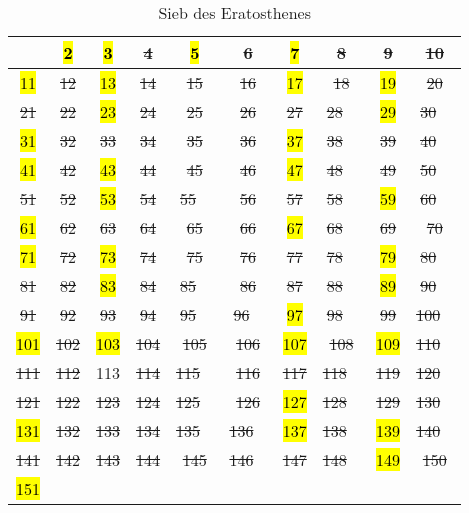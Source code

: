 \documentclass[12pt,a4paper]{article}
\theoremstyle{definition}
\begin{document}
\begin{table}[h]\begin{center}
\begin{tabular}{c|c|c|c|c|c|c|c|c|c}
   & \hl{ 2 }& \hl{ 3 }& \st{ 4 } & \hl{ 5 }& \st{ 6 } & \hl{ 7 }& \st{ 8 } & \st{ 9 } & \st{ 10 } \\
\hline
\hl{ 11 }& \st{ 12 } & \hl{ 13 }& \st{ 14 } & \st{ 15 } & \st{ 16 } & \hl{ 17 }& \st{ 18 } & \hl{ 19 }& \st{ 20 } \\
\hline
\st{ 21 } & \st{ 22 } & \hl{ 23 }& \st{ 24 } & \st{ 25 } & \st{ 26 } & \st{ 27 } & \st{ 28 } & \hl{ 29 }& \st{ 30 } \\
\hline
\hl{ 31 }& \st{ 32 } & \st{ 33 } & \st{ 34 } & \st{ 35 } & \st{ 36 } & \hl{ 37 }& \st{ 38 } & \st{ 39 } & \st{ 40 } \\
\hline
\hl{ 41 }& \st{ 42 } & \hl{ 43 }& \st{ 44 } & \st{ 45 } & \st{ 46 } & \hl{ 47 }& \st{ 48 } & \st{ 49 } & \st{ 50 } \\
\hline
\st{ 51 } & \st{ 52 } & \hl{ 53 }& \st{ 54 } & \st{ 55 } & \st{ 56 } & \st{ 57 } & \st{ 58 } & \hl{ 59 }& \st{ 60 } \\
\hline
\hl{ 61 }& \st{ 62 } & \st{ 63 } & \st{ 64 } & \st{ 65 } & \st{ 66 } & \hl{ 67 }& \st{ 68 } & \st{ 69 } & \st{ 70 } \\
\hline
\hl{ 71 }& \st{ 72 } & \hl{ 73 }& \st{ 74 } & \st{ 75 } & \st{ 76 } & \st{ 77 } & \st{ 78 } & \hl{ 79 }& \st{ 80 } \\
\hline
\st{ 81 } & \st{ 82 } & \hl{ 83 }& \st{ 84 } & \st{ 85 } & \st{ 86 } & \st{ 87 } & \st{ 88 } & \hl{ 89 }& \st{ 90 } \\
\hline
\st{ 91 } & \st{ 92 } & \st{ 93 } & \st{ 94 } & \st{ 95 } & \st{ 96 } & \hl{ 97 }& \st{ 98 } & \st{ 99 } & \st{ 100 } \\
\hline
\hl{ 101 }& \st{ 102 } & \hl{ 103 }& \st{ 104 } & \st{ 105 } & \st{ 106 } & \hl{ 107 }& \st{ 108 } & \hl{ 109 }& \st{ 110 } \\
\hline
\st{ 111 } & \st{ 112 } & 113 & \st{ 114 } & \st{ 115 } & \st{ 116 } & \st{ 117 } & \st{ 118 } & \st{ 119 } & \st{ 120 } \\
\hline
\st{ 121 } & \st{ 122 } & \st{ 123 } & \st{ 124 } & \st{ 125 } & \st{ 126 } & \hl{ 127 }& \st{ 128 } & \st{ 129 } & \st{ 130 } \\
\hline
\hl{ 131 }& \st{ 132 } & \st{ 133 } & \st{ 134 } & \st{ 135 } & \st{ 136 } & \hl{ 137 }& \st{ 138 } & \hl{ 139 }& \st{ 140 } \\
\hline
\st{ 141 } & \st{ 142 } & \st{ 143 } & \st{ 144 } & \st{ 145 } & \st{ 146 } & \st{ 147 } & \st{ 148 } & \hl{ 149 }& \st{ 150 } \\
\hline
\hl{ 151 }& & & & & & & & & \\
\end{tabular}\end{center}
\caption{Sieb des Eratosthenes}
\label{tab:Sieb des Eratosthenes}
\end{table}
\end{document}
